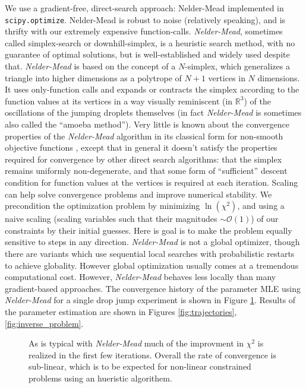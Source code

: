\documentclass[12pt,a4paper,oneside]{book}
\begin{document}
We use a gradient-free, direct-search approach: Nelder-Mead \cite{nelder_simplex_1965} implemented in \verb|scipy.optimize|. Nelder-Mead is robust to noise (relatively speaking), and is thrifty with our extremely expensive function-calls.  \emph{Nelder-Mead}, sometimes called simplex-search or downhill-simplex, is a heuristic search method, with no guarantee of optimal solutions, but is well-established and widely used despite that. \emph{Nelder-Mead} is based on the concept of a $N$-simplex, which generalizes a triangle into higher dimensions as a polytrope of $N + 1$ vertices in $N$ dimensions. It uses only-function calls and expands or contracts the simplex according to the function values at its vertices in a way visually reminiscent (in $\mathbb{R}^3$) of the oscillations of the jumping droplets themselves (in fact \emph{Nelder-Mead} is sometimes also called the ``amoeba method''). Very little is known about the convergence properties of the \emph{Nelder-Mead} algorithm in its classical form for non-smooth objective functions \cite{price_convergent_2002}, except that in general it doesn't satisfy the properties required for convergence by other direct search algorithms: that the simplex remains uniformly non-degenerate, and that some form of ``sufficient'' descent condition for function values at the vertices is required at each iteration. Scaling can help solve convergence problems and improve numerical stability. We precondition the optimization problem by minimizing $\ln(\chi^2)$, and using a naive scaling (scaling variables such that their magnitudes $\sim \mathcal{O}(1)$) of our constraints by their initial guesses. Here is goal is to make the problem equally sensitive to steps in any direction. \emph{Nelder-Mead} is not a global optimizer, though there are variants which use sequential local searches with probabilistic restarts to achieve globality. However global optimization usually comes at a tremendous computational cost. However, \emph{Nelder-Mead} behaves less locally than many gradient-based approaches. The convergence history of the parameter MLE using \emph{Nelder-Mead} for a single drop jump experiment is shown in Figure \ref{fig:convergence}. Results of the parameter estimation are shown in Figures \ref{fig:trajectories}, \ref{fig:inverse_problem}.

\begin{figure}[h]
    \centering
    
    \caption{As is typical with \emph{Nelder-Mead} much of the improvment in $\chi^2$ is realized in the first few iterations. Overall the rate of convergence is sub-linear, which is to be expected for non-linear constrained problems using an hueristic algorithem.\label{fig:convergence}}
\end{figure}
\end{document}
